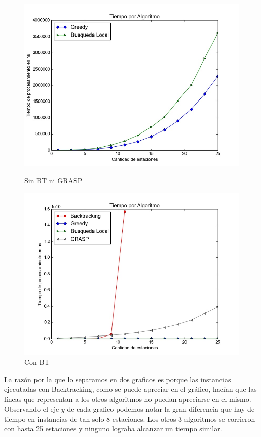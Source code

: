         \begin{figure}[H]
          \includegraphics[width=\linewidth]{imagenes/exp1a_ej5_tiempo_sin_BT.jpeg}
          \caption{Sin BT ni GRASP}
        \endminipage\hfill
          \includegraphics[width=\linewidth]{imagenes/exp1a_ej5_tiempo_con_BT.jpeg}
          \caption{Con BT}
        \endminipage
        \end{figure}

        \blindtext

        La razón por la que lo separamos en dos graficos es porque las instancias ejecutadas con Backtracking, como se puede apreciar en el gráfico, hacían que las líneas que representan a los otros algoritmos no puedan apreciarse en el mismo. Observando el eje $y$ de cada grafico podemos notar la gran diferencia que hay de tiempo en instancias de tan solo 8 estaciones. Los otros 3 algoritmos se corrieron con hasta 25 estaciones y ninguno lograba alcanzar un tiempo similar.


